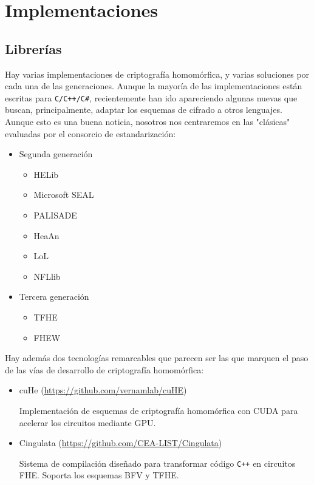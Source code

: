\chapter{Implementaciones}
\label{chap:libs}

\section{Librerías}

Hay varias implementaciones de criptografía homomórfica, y varias soluciones por cada una de las generaciones. Aunque la mayoría de las implementaciones están escritas para \verb|C/C++/C#|, recientemente han ido apareciendo algunas nuevas que buscan, principalmente, adaptar los esquemas de cifrado a otros lenguajes. Aunque esto es una buena noticia, nosotros nos centraremos en las "clásicas" evaluadas por el consorcio de estandarización:

\begin{itemize}
    \item Segunda generación
    \begin{itemize}
        \item HELib
        \item Microsoft SEAL
        \item PALISADE
        \item HeaAn
        \item LoL
        \item NFLlib
    \end{itemize}
    \item Tercera generación
    \begin{itemize}
        \item TFHE
        \item FHEW
    \end{itemize}
\end{itemize}

Hay además dos tecnologías remarcables que parecen ser las que marquen el paso de las vías de desarrollo de criptografía homomórfica:

\begin{itemize}
    \item cuHe (\url{https://github.com/vernamlab/cuHE})
    
    Implementación de esquemas de criptografía homomórfica con CUDA para acelerar los circuitos mediante GPU.
    
    \item Cingulata (\url{https://github.com/CEA-LIST/Cingulata})
    
    Sistema de compilación diseñado para transformar código \verb|C++| en circuitos FHE. Soporta los esquemas BFV y TFHE.
    
\end{itemize}

